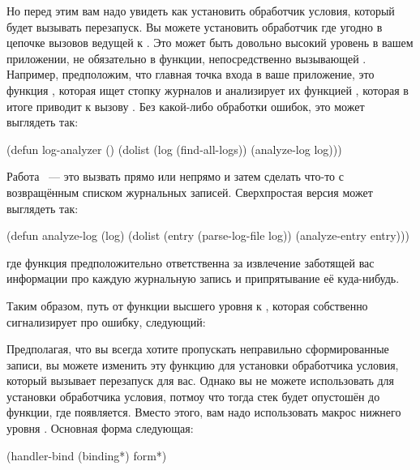 Но перед этим вам надо увидеть как установить обработчик условия, который будет вызывать
 перезапуск. Вы можете установить обработчик где угодно в цепочке
вызовов ведущей к . Это может быть довольно высокий уровень в вашем
приложении, не обязательно в функции, непосредственно вызывающей
. Например, предположим, что главная точка входа в ваше приложение,
это функция , которая ищет стопку журналов и анализирует их функцией
, которая в итоге приводит к вызову . Без
какой-либо обработки ошибок, это может выглядеть так:

\begin{myverb}
(defun log-analyzer ()
  (dolist (log (find-all-logs))
    (analyze-log log)))
\end{myverb}

Работа ~--- это вызвать прямо или непрямо  и затем
сделать что-то с возвращённым списком журнальных записей. Сверхпростая версия может
выглядеть так:

\begin{myverb}
(defun analyze-log (log)
  (dolist (entry (parse-log-file log))
    (analyze-entry entry)))
\end{myverb}

\noindent{}где функция  предположительно ответственна за извлечение заботящей вас
информации про каждую журнальную запись и припрятывание её куда-нибудь.

Таким образом, путь от функции высшего уровня  к
, которая собственно сигнализирует про ошибку, следующий:


Предполагая, что вы всегда хотите пропускать неправильно сформированные записи, вы можете
изменить эту функцию для установки обработчика условия, который вызывает перезапуск
 для вас. Однако вы не можете использовать  для
установки обработчика условия, потмоу что тогда стек будет опустошён до функции, где
 появляется. Вместо этого, вам надо использовать макрос нижнего уровня
. Основная форма  следующая:

\begin{myverb}
(handler-bind (binding*) form*)
\end{myverb}

